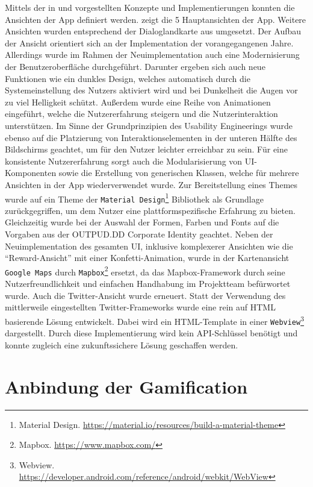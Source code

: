 Mittels der in  und  vorgestellten Konzepte und Implementierungen konnten die Ansichten der App definiert werden.  zeigt die 5 Hauptansichten der App. Weitere Ansichten wurden entsprechend der Dialoglandkarte aus  umgesetzt. Der Aufbau der Ansicht orientiert sich an der Implementation der vorangegangenen Jahre. Allerdings wurde im Rahmen der Neuimplementation auch eine Modernisierung der Benutzeroberfläche durchgeführt. Darunter ergeben sich auch neue Funktionen wie ein dunkles Design, welches automatisch durch die Systemeinstellung des Nutzers aktiviert wird und bei Dunkelheit die Augen vor zu viel Helligkeit schützt. Außerdem wurde eine Reihe von Animationen eingeführt, welche die Nutzererfahrung steigern und die Nutzerinteraktion unterstützen. Im Sinne der Grundprinzipien des Usability Engineerings wurde ebenso auf die Platzierung von Interaktionselementen in der unteren Hälfte des Bildschirms geachtet, um für den Nutzer leichter erreichbar zu sein. Für eine konsistente Nutzererfahrung sorgt auch die Modularisierung von UI-Komponenten sowie die Erstellung von generischen Klassen, welche für mehrere Ansichten in der App wiederverwendet wurde. Zur Bereitstellung eines Themes wurde auf ein Theme der \texttt{Material Design}\footnote{Material Design. \url{https://material.io/resources/build-a-material-theme}} Bibliothek als Grundlage zurückgegriffen, um dem Nutzer eine plattformspezifische Erfahrung zu bieten. Gleichzeitig wurde bei der Auswahl der Formen, Farben und Fonts auf die Vorgaben aus der OUTPUD.DD Corporate Identity geachtet. Neben der Neuimplementation des gesamten UI, inklusive komplexerer Ansichten wie die \enquote{Reward-Ansicht} mit einer Konfetti-Animation, wurde in der Kartenansicht \texttt{Google Maps} durch \texttt{Mapbox}\footnote{Mapbox. \url{https://www.mapbox.com/}} ersetzt, da das Mapbox-Framework durch seine Nutzerfreundlichkeit und einfachen Handhabung im Projektteam befürwortet wurde. Auch die Twitter-Ansicht wurde erneuert. Statt der Verwendung des mittlerweile eingestellten Twitter-Frameworks wurde eine rein auf HTML basierende Lösung entwickelt. Dabei wird ein HTML-Template in einer \texttt{Webview}\footnote{Webview. \url{https://developer.android.com/reference/android/webkit/WebView}} dargestellt. Durch diese Implementierung wird kein API-Schlüssel benötigt und konnte zugleich eine zukunftssichere Lösung geschaffen werden.

\newpage

\section{Anbindung der Gamification}

